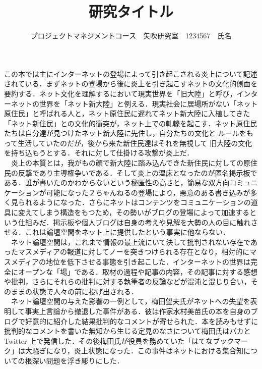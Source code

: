 \documentclass[uplatex,twocolumn,dvipdfmx]{jsarticle}
\title{\vspace{-5mm}\fontsize{14pt}{0pt}\selectfont 研究タイトル}
\author{\normalsize プロジェクトマネジメントコース　矢吹研究室　1234567　氏名}
\date{}
\begin{document}
\fontsize{10.5pt}{\baselineskip}\selectfont
\maketitle







この本では主にインターネットの登場によって引き起こされる炎上について記述されている．まずネットの登場から後に炎上を引き起こすネットの文化的側面を要約する．ネット文化を理解するにおいて現実世界を「旧大陸」と呼び，インターネットの世界を「ネット新大陸」と例える．現実社会に居場所がない「ネット原住民」と呼ばれる人と，ネット原住民に遅れてネット新大陸に入植してきた「ネット新住民」との文化的衝突が，ネット上での軋轢を起こす．ネット原住民たちは自分達が見つけたネット新大陸に先住し，自分たちの文化と ルールをもって生活していたのだが，後から来た新住民達はそれを無視して   旧大陸の文化を持ち込もうとする．それに対して仕掛ける攻撃が炎上だ．\\
　炎上の本質とは，我がもの顔で新大陸に踏み込んできた新住民に対しての原住民の反撃であり主導権争いである．そして炎上の温床となったのが匿名掲示板である．誰が書いたのかわからないという秘匿性の高さと，簡易な双方向コミュニケーションが可能になった２ちゃんねるの登場により，悪意のある書き込みが多く見られるようになった．さらにネットはコンテンツをコミュニケーションの道具に変えてしまう構造をもつため，その勢いがブログの登場によって加速するという仕組みだ．掲示板や個人ブログは自身の考えや見解を大勢の人の目に触れさせる．これは論壇空間をネット上に提供したという事実に他ならない．\\
　ネット論壇空間は，これまで情報の最上流にいて決して批判されない存在であったマスメディアの報道に対してノーを突きつけられる存在となり，相対的にマスメディアの地位を低下させる事態を引き起こした．インターネットの世界は完全にオープンな「場」である．取材の過程や記事の内容，その記事に対する感想や批判，さらにそれらの批判に対する執筆者の反論などが混沌と混じり合い，そのままの状態で人々の前に投げ出される．\\
　ネット論壇空間の与えた影響の一例として，梅田望夫氏がネットへの失望を表明して事実上言論から撤退した事件がある．彼は作家水村美苗氏の本を自身のブログで好意的に紹介した結果批判的なコメントが寄せられた．本を読みもせずに批判的なコメントを書いた無知から生じる定見のなさについて梅田氏はバカと Twitter 上で発信した．その後梅田氏が役員を務めていた「はてなブックマーク」は大騒ぎになり，炎上状態になった．この事件はネットにおける集合知についての根深い問題を浮き彫りにした．\\
\end{document}
